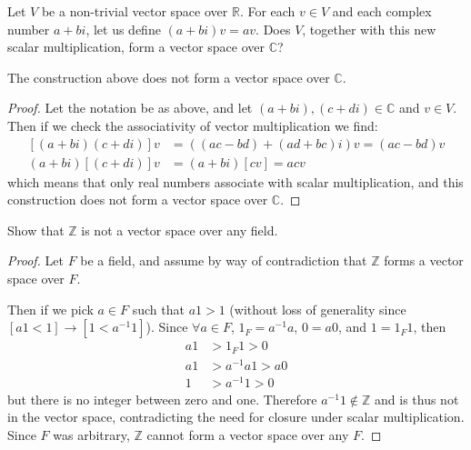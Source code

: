 \documentclass{article}
\begin{document}
\setcounter{problem}{60}
\begin{problem}
Let $V$ be a non-trivial vector space over $\mathbb{R}$. For each $v \in V$ and each complex number $a + bi$, let us define $(a+bi)v = av$. Does $V$, together with this new scalar multiplication, form a vector space over $\mathbb{C}$?
\end{problem}

\begin{solution}
The construction above does not form a vector space over $\mathbb{C}$.
\begin{proof}
Let the notation be as above, and let $(a+bi),(c+di) \in \mathbb{C}$ and $v \in V$. Then if we check the associativity of vector multiplication we find:
\begin{align*}
\left[(a+bi)(c+di)\right]v &= \left( (ac-bd) + (ad+bc)i \right)v = (ac-bd)v\\
(a+bi)\left[(c+di)\right]v &= (a+bi)[cv] = acv
\end{align*}
which means that only real numbers associate with scalar multiplication, and this construction does not form a vector space over $\mathbb{C}$.
\end{proof}
\end{solution}

\setcounter{problem}{69}
\begin{problem}
Show that $\mathbb{Z}$ is not a vector space over any field.
\end{problem}

\begin{solution}
\begin{proof}
Let $F$ be a field, and assume by way of contradiction that $\mathbb{Z}$ forms a vector space over $F$.

Then if we pick $a \in F$ such that $a1>1$ (without loss of generality since $[a1<1]\to [1<a^{-1}1]$).
Since $\forall a\in F$, $1_{F}=a^{-1}a$, $0=a0$, and $1 = 1_{F}1$, then
\begin{align*}
a1 &> 1_{F}1 > 0	\\
a1 &> a^{-1}a1 > a0	\\
1 &> a^{-1}1 > 0
\end{align*}
but there is no integer between zero and one. Therefore $a^{-1}1 \notin \mathbb{Z}$ and is thus not in the vector space, contradicting the need for closure under scalar multiplication. Since $F$ was arbitrary, $\mathbb{Z}$ cannot form a vector space over any $F$.
\end{proof}
\end{solution}
\end{document}

